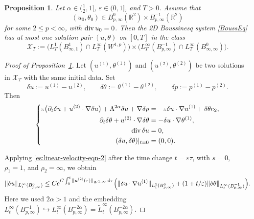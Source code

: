 \documentclass[reqno,11pt,a4paper]{amsart}
\newtheorem{proposition}[theorem]{Proposition}
\newcommand{\dd}{\mathrm{d}}
\renewcommand{\div}{{\rm div\,}}
\begin{document}
\begin{proposition}\label{prop:uniq}
Let $\alpha\in(\tfrac12,1]$,
$\varepsilon\in(0,1]$, and $T>0$.
Assume that
\[
  (u_0,\theta_0)
  \in B^0_{p,\infty}(\mathbb R^2)
  \times B^{-1}_{p,\infty}(\mathbb R^2)
\]
for some $2\leq p<\infty$, with $\div u_0=0$.
Then the 2D Boussinesq system \eqref{BoussEq}
has at most one solution pair $(u,\theta)$
on $[0,T]$ in the class
\[
  \mathcal X_T
  :=
  \bigl(
    L^1_T(B^1_{\infty,1})
    \cap L^\infty_T(W^{1,p})
  \bigr)
  \times
  \bigl(
    L^\infty_T(B^{-1}_{p,\infty})
    \cap L^\infty_T(B^0_{\infty,\infty})
  \bigr).
\]
\end{proposition}

\begin{proof}[Proof of Proposition~\ref{prop:uniq}]
Let $(u^{(1)},\theta^{(1)})$
and $(u^{(2)},\theta^{(2)})$
be two solutions in $\mathcal X_T$
with the same initial data.
Set
\[
  \delta u:=u^{(1)}-u^{(2)},
  \qquad
  \delta\theta:=\theta^{(1)}-\theta^{(2)},
  \qquad
  \delta p:=p^{(1)}-p^{(2)}.
\]
Then
\[
\left\{
\begin{aligned}
  \varepsilon
  \bigl(
    \partial_t\delta u
    +u^{(2)}\cdot\nabla\delta u
  \bigr)
  +\Lambda^{2\alpha}\delta u+\nabla\delta p
  &=
  -\varepsilon\delta u\cdot\nabla u^{(1)}
  +\delta\theta e_2,
  \\
  \partial_t\delta\theta
  +u^{(2)}\cdot\nabla\delta\theta
  &=
  -\delta u\cdot\nabla\theta^{(1)},
  \\
  \div\delta u&=0,
  \\
  (\delta u,\delta\theta)|_{t=0}&=(0,0).
\end{aligned}
\right.
\]

Applying \eqref{es:linear-velocity-eqn-2}
after the time change $t=\varepsilon\tau$,
with $s=0$, $\rho_1=1$, and $\rho_2=\infty$,
we obtain
\begin{equation}\label{eqn-the-thing-to-bound}
\begin{aligned}
  \Vert \delta u\Vert _{L^\infty_t(B^0_{p,\infty})}
  \leq
  Ce^{C\int_0^t
    \Vert u^{(2)}(\tau)\Vert _{W^{1,\infty}}\,\dd\tau}
  \Bigl(
    \Vert \delta u\cdot\nabla u^{(1)}
      \Vert _{L^1_t(B^0_{p,\infty})}
      +(1+t/\varepsilon)
    \Vert \delta\theta\Vert _{L^\infty_t(B^{-1}_{p,\infty})}
  \Bigr).
\end{aligned}
\end{equation}
Here we used $2\alpha>1$ and the embedding
$L^\infty_t(B^{-1}_{p,\infty}) \hookrightarrow L^\infty_t(B^{-2\alpha}_{p,\infty})
= \widetilde L^\infty_t(B^{-2\alpha}_{p,\infty})$.


\end{proof}
\end{document}
